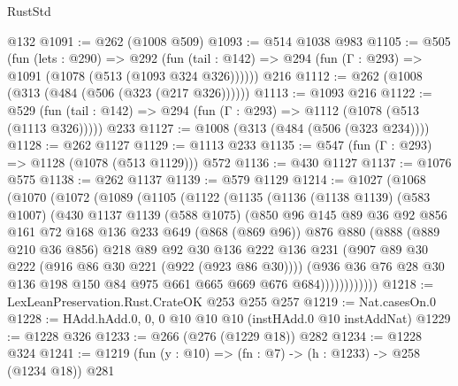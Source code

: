 \begin{lexlean}{RustStd}
\begin{coremodule}
    @132
@1091 := @262 (@1008 @509)
@1093 := @514 @1038 @983
@1105 := @505
    (fun (lets : @290) =>
    @292 (fun (tail : @142) => @294 (fun (Γ : @293) => @1091 (@1078 (@513 (@1093 @324 @326))))))
    @216
@1112 := @262 (@1008 (@313 (@484 (@506 (@323 (@217 @326))))))
@1113 := @1093 @216
@1122 := @529 (fun (tail : @142) => @294 (fun (Γ : @293) => @1112 (@1078 (@513 (@1113 @326))))) @233
@1127 := @1008 (@313 (@484 (@506 (@323 @234))))
@1128 := @262 @1127
@1129 := @1113 @233
@1135 := @547 (fun (Γ : @293) => @1128 (@1078 (@513 @1129))) @572
@1136 := @430 @1127
@1137 := @1076 @575
@1138 := @262 @1137
@1139 := @579 @1129
@1214 := @1027
    (@1068
      (@1070
        (@1072
          (@1089
            (@1105
              (@1122
                (@1135
                  (@1136
                    (@1138 @1139)
                    (@583 @1007)
                    (@430
                      @1137
                      @1139
                      (@588 @1075)
                      (@850
                        @96
                        @145
                        @89
                        @36
                        @92
                        @856
                        @161
                        @72
                        @168
                        @136
                        @233
                        @649
                        (@868 (@869 @96))
                        @876
                        @880
                        (@888
                          (@889 @210 @36 @856)
                          @218
                          @89
                          @92
                          @30
                          @136
                          @222
                          @136
                          @231
                          (@907 @89 @30 @222 (@916 @86 @30 @221 (@922 (@923 @86 @30))))
                          (@936
                            @36
                            @76
                            @28
                            @30
                            @136
                            @198
                            @150
                            @84
                            @975
                            @661
                            @665
                            @669
                            @676
                            @684))))))))))))
@1218 := LexLeanPreservation.Rust.CrateOK @253 @255 @257
@1219 := Nat.casesOn.{0}
@1228 := HAdd.hAdd.{0, 0, 0} @10 @10 @10 (instHAdd.{0} @10 instAddNat)
@1229 := @1228 @326
@1233 := @266 (@276 (@1229 @18)) @282
@1234 := @1228 @324
@1241 := @1219 (fun (y : @10) => (fn : @7) -> (h : @1233) -> @258 (@1234 @18)) @281

\end{coremodule}
\end{lexlean}

